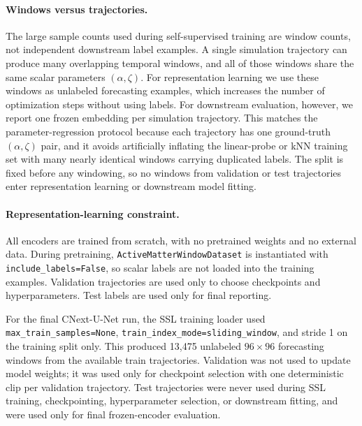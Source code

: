 \documentclass{article}
\begin{document}
\paragraph{Windows versus trajectories.}
The large sample counts used during self-supervised training are window counts, not independent downstream label examples. A single simulation trajectory can produce many overlapping temporal windows, and all of those windows share the same scalar parameters $(\alpha,\zeta)$. For representation learning we use these windows as unlabeled forecasting examples, which increases the number of optimization steps without using labels. For downstream evaluation, however, we report one frozen embedding per simulation trajectory. This matches the parameter-regression protocol because each trajectory has one ground-truth $(\alpha,\zeta)$ pair, and it avoids artificially inflating the linear-probe or kNN training set with many nearly identical windows carrying duplicated labels. The split is fixed before any windowing, so no windows from validation or test trajectories enter representation learning or downstream model fitting.

\paragraph{Representation-learning constraint.}
All encoders are trained from scratch, with no pretrained weights and no external data. During pretraining, \texttt{ActiveMatterWindowDataset} is instantiated with \texttt{include\_labels=False}, so scalar labels are not loaded into the training examples. Validation trajectories are used only to choose checkpoints and hyperparameters. Test labels are used only for final reporting.

For the final CNext-U-Net run, the SSL training loader used \texttt{max\_train\_samples=None}, \texttt{train\_index\_mode=sliding\_window}, and stride 1 on the training split only. This produced 13,475 unlabeled $96\times96$ forecasting windows from the available train trajectories. Validation was not used to update model weights; it was used only for checkpoint selection with one deterministic clip per validation trajectory. Test trajectories were never used during SSL training, checkpointing, hyperparameter selection, or downstream fitting, and were used only for final frozen-encoder evaluation.
\end{document}
